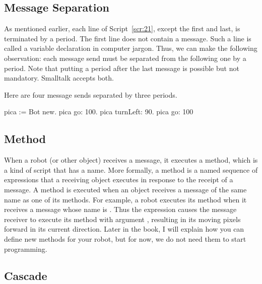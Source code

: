 \documentclass[a4paper,10pt,twoside]{book}
\begin{document}
\subsection{Message Separation}
As mentioned earlier, each line of Script~\ref{scr:21}, except the first and last, is terminated by a period. 
The first line does not contain a message. Such a line is called a variable declaration in computer 
jargon. Thus, we can make the following observation: each message send must be separated 
from the following one by a period. Note that putting a period after the last message is possible 
but not mandatory. Smalltalk accepts both. 


Here are four message sends separated by three periods.
\begin{code}{}
	pica := Bot new. 
	pica go: 100. 
	pica turnLeft: 90. 
	pica go: 100 
\end{code}



\subsection{Method}
When a robot (or other object) receives a message, it executes a method, which is a kind of 
script that has a name. More formally, a method is a named sequence of expressions that a 
receiving object executes in response to the receipt of a message. A method is executed when 
an object receives a message of the same name as one of its methods. For example, a robot 
executes its method  when it receives a message whose name is . Thus the expression 
 causes the message receiver  to execute its method  with argument , 
resulting in its moving  pixels forward in its current direction. Later in the book, I will 
explain how you can define new methods for your robot, but for now, we do not need them 
to start programming. 

\subsection{Cascade}
\end{document}

